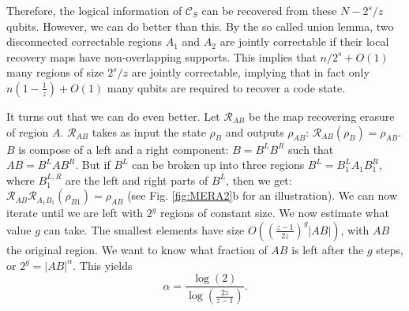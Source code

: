 \documentclass[a4paper,11pt]{article}
\newcommand{\1}{\mathbbm{1}}
\newcommand{\cC}{\mathcal{C}}
\newcommand{\cR}{\mathcal{R}}
\begin{document}
Therefore, the logical information of $\cC_S$ can be recovered from these $N-2^s/z$ qubits. However, we can do better than this. By the so called union lemma\cite{Bravyi2008,Bravyi2010,Flammia2016}, two disconnected correctable regions $A_1$ and $A_2$ are jointly correctable if their local recovery maps have non-overlapping supports. This implies that $n/2^s+O(1)$ many regions of size $2^s/z$ are jointly correctable, implying that in fact only $n(1-\frac{1}{z})+O(1)$ many qubits are required to recover a code state.



It turns out that we can do even better. Let $\cR_{AB}$ be the map recovering erasure of region $A$. $\cR_{AB}$ takes as input the state $\rho_B$ and outputs $\rho_{AB}$: $\cR_{AB}(\rho_B)= \rho_{AB}$. $B$ is compose of a left and a right component: $B=B^LB^R$ such that $AB=B^LAB^R$. But if $B^L$ can be broken up into three regions $B^L=B_1^LA_1B_1^R$, where $B_1^{L,R}$ are the left and right parts of $B^L$, then we get: $\cR_{AB}\cR_{A_1B_1}(\rho_{B1})=\rho_{AB}$ (see Fig. \ref{fig:MERA2}b for an illustration). We can now iterate until we are left with $2^g$ regions of constant size. We now estimate what value $g$ can take. The smallest elements have size $O((\frac{z-1}{2z})^g|AB|)$, with $AB$ the original region. We want to know what fraction of $AB$ is left after the $g$ steps, or $2^g=|AB|^\alpha$. This yields
\begin{equation}
\alpha = \frac{\log(2)}{\log\left(\frac{2z}{z-1}\right)}.
\end{equation}
\end{document}
